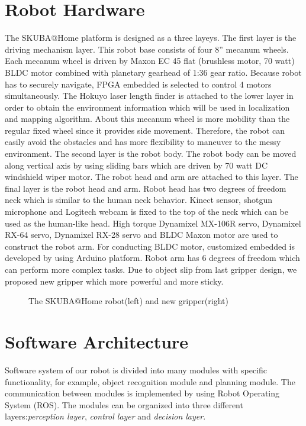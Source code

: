 \documentclass{llncs}
\begin{document}
\section{Robot Hardware}

The SKUBA@Home platform is designed as a three layeys. The first layer is the driving mechanism layer. This robot base consists of four 8'' mecanum wheels. Each mecanum wheel is driven by Maxon EC 45 flat (brushless motor, 70 watt) BLDC motor combined with planetary gearhead of 1:36 gear ratio. Because robot has to securely navigate, FPGA embedded is selected to control 4 motors simultaneously. The Hokuyo laser length finder is attached to the lower layer in order to obtain the environment information which will be used in localization and mapping algorithm. About this mecanum wheel is more mobility than the regular fixed wheel since it provides side movement. Therefore, the robot can easily avoid the obstacles and has more flexibility to maneuver to the messy environment. The second layer is the robot body. The robot body can be moved along vertical axis by using sliding bars which are driven by 70 watt DC windshield wiper motor. The robot head and arm are attached to this layer. The final layer is the robot head and arm. Robot head has two degrees of freedom neck which is similar to the human neck behavior. Kinect sensor, shotgun microphone and Logitech webcam is fixed to the top of the neck which can be used as the human-like head. High torque Dynamixel MX-106R servo, Dynamixel RX-64 servo, Dynamixel RX-28 servo and BLDC Maxon motor are used to construct the robot arm. For conducting BLDC motor, customized embedded is developed by using Arduino platform\cite{con_arm}. Robot arm has 6 degrees of freedom which can perform more complex tasks. Due to object slip from last gripper design, we proposed new gripper which more powerful and more sticky.

\begin{figure}
\centering
\caption{The SKUBA@Home robot(left) and new gripper(right)}
\label{fig:base}
\end{figure}

\section{Software Architecture}
Software system of our robot is divided into many modules with specific functionality, for example, object recognition module and planning module. The communication between modules is implemented by using Robot Operating System (ROS). The modules can be organized into three different layers:\textit{perception layer}, \textit{control layer} and \textit{decision layer}.
\end{document}
